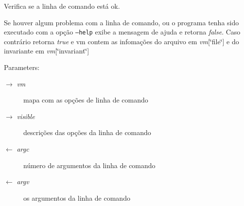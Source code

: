 Verifica se a linha de comando está ok. 

Se houver algum problema com a linha de comando, ou o programa tenha sido executado com a opção {\tt --help} exibe a mensagem de ajuda e retorna {\em false\/}. Caso contrário retorna {\em true\/} e vm contem as infomações do arquivo em {\em vm\/}[\char`\"{}file\char`\"{}] e do invariante em {\em vm\/}[\char`\"{}invariant\char`\"{}]

\begin{Desc}
\item[Parameters:]
\begin{description}
\item[\mbox{$\rightarrow$} {\em vm}]mapa com as opções de linha de comando \item[\mbox{$\rightarrow$} {\em visible}]descrições das opções da linha de comando \item[\mbox{$\leftarrow$} {\em argc}]número de argumentos da linha de comando \item[\mbox{$\leftarrow$} {\em argv}]os argumentos da linha de comando \end{description}
\end{Desc}
